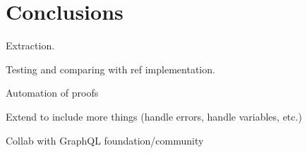\section{Conclusions}
\label{sec:conclusion}




Extraction.

Testing and comparing with ref implementation.

Automation of proofs

Extend to include more things (handle errors, handle variables, etc.)

Collab with GraphQL foundation/community
